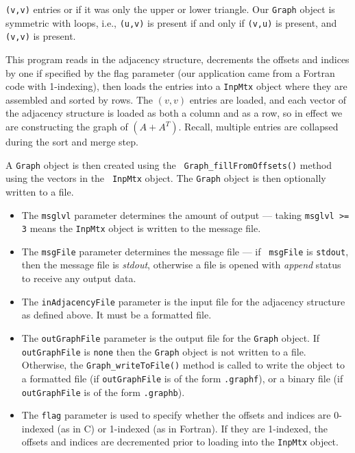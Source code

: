 \begin{enumerate}
{\tt (v,v)} entries or if it was only the upper or lower triangle.
Our {\tt Graph} object is symmetric with loops, i.e.,
{\tt (u,v)} is present if and only if {\tt (v,u)} is present,
and {\tt (v,v)} is present.
\par
This program reads in the adjacency structure, decrements the
offsets and indices by one if specified by the flag parameter
(our application came from a Fortran code with 1-indexing),
then loads the entries into a {\tt InpMtx} object where they are
assembled and sorted by rows.
The $(v,v)$ entries are loaded, and each vector of the adjacency
structure is loaded as both a column and as a row, so in effect we
are constructing the graph of $(A+A^T)$.
Recall, multiple entries are collapsed during the sort and merge
step.
\par
A {\tt Graph} object is then created using the {\tt
Graph\_fillFromOffsets()} method using the vectors in the {\tt
InpMtx} object.
The {\tt Graph} object is then optionally written to a file.
\par
\begin{itemize}
\item
The {\tt msglvl} parameter determines the amount of output ---
taking {\tt msglvl >= 3} means the {\tt InpMtx} object is written
to the message file.
\item
The {\tt msgFile} parameter determines the message file --- if {\tt
msgFile} is {\tt stdout}, then the message file is {\it stdout},
otherwise a file is opened with {\it append} status to receive any
output data.
\item
The {\tt inAdjacencyFile} parameter is the input file for the 
adjacency structure as defined above.
It must be a formatted file.
\item
The {\tt outGraphFile} parameter is the output file for the 
{\tt Graph} object. 
If {\tt outGraphFile} is {\tt none} then the {\tt Graph} object is not
written to a file. 
Otherwise, the {\tt Graph\_writeToFile()} method is called to write
the object to 
a formatted file (if {\tt outGraphFile} is of the form 
{\tt *.graphf}),
or
a binary file (if {\tt outGraphFile} is of the form {\tt *.graphb}).
\item
The {\tt flag} parameter is used to specify whether the offsets
and indices are 0-indexed (as in C) or 1-indexed (as in Fortran).
If they are 1-indexed, the offsets and indices are decremented
prior to loading into the {\tt InpMtx} object.
\end{itemize}

\end{enumerate}
